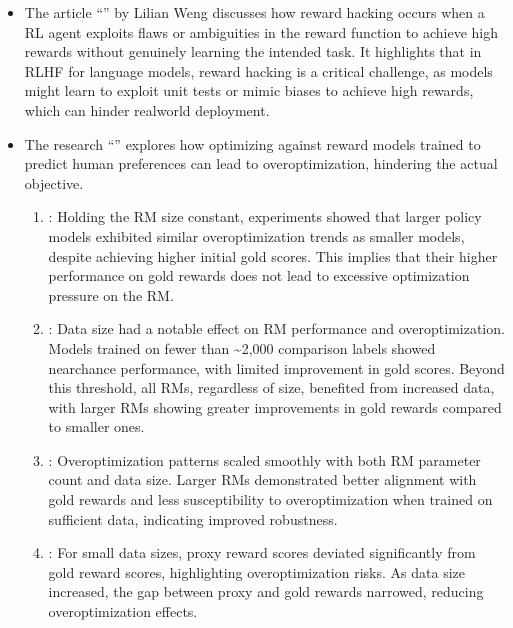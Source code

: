 \documentclass[letterpaper,11pt,english]{sphinxmanual}
\begin{document}
\begin{itemize}
\item {} 
\sphinxAtStartPar
The article “”
by Lilian Weng discusses how reward hacking occurs when a RL agent
exploits flaws or ambiguities in the reward function to achieve high
rewards without genuinely learning the intended task. It highlights
that in RLHF for language models, reward hacking is a critical
challenge, as models might learn to exploit unit tests or mimic biases
to achieve high rewards, which can hinder real\sphinxhyphen{}world deployment.

\item {} 
\sphinxAtStartPar
The research “” explores how
optimizing against reward models trained to predict human preferences
can lead to overoptimization, hindering the actual objective.
\begin{enumerate}
%
\item {} 
\sphinxAtStartPar
{}: Holding the RM size constant,
experiments showed that larger policy models exhibited similar
overoptimization trends as smaller models, despite achieving higher
initial gold scores. This implies that their higher performance on
gold rewards does not lead to excessive optimization pressure on
the RM.

\item {} 
\sphinxAtStartPar
{}: Data size had a notable effect
on RM performance and overoptimization. Models trained on fewer
than \textasciitilde{}2,000 comparison labels showed near\sphinxhyphen{}chance performance, with
limited improvement in gold scores. Beyond this threshold, all RMs,
regardless of size, benefited from increased data, with larger RMs
showing greater improvements in gold rewards compared to smaller
ones.

\item {} 
\sphinxAtStartPar
{}: Overoptimization
patterns scaled smoothly with both RM parameter count and data
size. Larger RMs demonstrated better alignment with gold rewards
and less susceptibility to overoptimization when trained on
sufficient data, indicating improved robustness.

\item {} 
\sphinxAtStartPar
{}: For small data sizes, proxy
reward scores deviated significantly from gold reward scores,
highlighting overoptimization risks. As data size increased, the
gap between proxy and gold rewards narrowed, reducing
overoptimization effects.

\end{enumerate}

\end{itemize}
\end{document}
